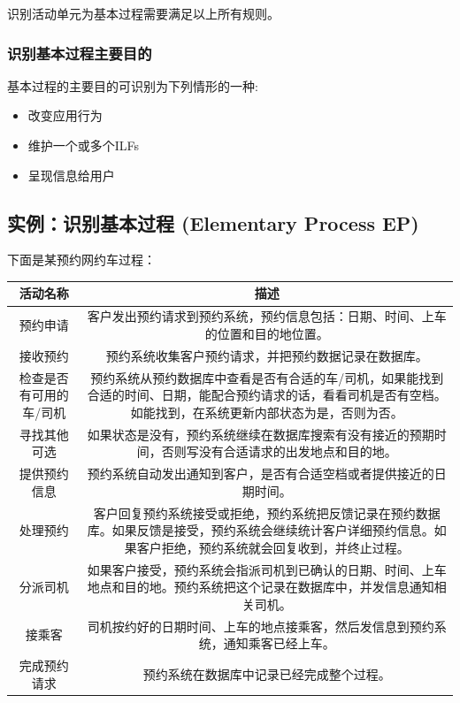 识别活动单元为基本过程需要满足以上所有规则。\\

\hypertarget{ux8bc6ux522bux57faux672cux8fc7ux7a0bux4e3bux8981ux76eeux7684}{%
\subsubsection{识别基本过程主要目的}\label{ux8bc6ux522bux57faux672cux8fc7ux7a0bux4e3bux8981ux76eeux7684}}

基本过程的主要目的可识别为下列情形的一种:

\begin{itemize}
\tightlist
\item
  改变应用行为
\item
  维护一个或多个ILFs
\item
  呈现信息给用户
\end{itemize}

\hypertarget{ux5b9eux4f8bux8bc6ux522bux57faux672cux8fc7ux7a0b-ep-elementary-process}{%
\subsection{实例：识别基本过程 (Elementary
Process EP)}\label{ux5b9eux4f8bux8bc6ux522bux57faux672cux8fc7ux7a0b-ep-elementary-process}}

下面是某预约网约车过程：


\begin{tabular}{|c|c|}
\hline
活动名称&描述\\
\hline
预约申请&客户发出预约请求到预约系统，预约信息包括：日期、时间、上车的位置和目的地位置。\\
\hline
接收预约&预约系统收集客户预约请求，并把预约数据记录在数据库。\\
\hline
检查是否有可用的车/司机&预约系统从预约数据库中查看是否有合适的车/司机，如果能找到合适的时间、日期，能配合预约请求的话，看看司机是否有空档。如能找到，在系统更新内部状态为是，否则为否。 \\
\hline
寻找其他可选&如果状态是没有，预约系统继续在数据库搜索有没有接近的预期时间，否则写没有合适请求的出发地点和目的地。 \\
\hline
提供预约信息&预约系统自动发出通知到客户，是否有合适空档或者提供接近的日期时间。 \\
\hline
处理预约&客户回复预约系统接受或拒绝，预约系统把反馈记录在预约数据库。如果反馈是接受，预约系统会继续统计客户详细预约信息。如果客户拒绝，预约系统就会回复收到，并终止过程。 \\
\hline
分派司机&如果客户接受，预约系统会指派司机到已确认的日期、时间、上车地点和目的地。预约系统把这个记录在数据库中，并发信息通知相关司机。 \\
\hline
接乘客&司机按约好的日期时间、上车的地点接乘客，然后发信息到预约系统，通知乘客已经上车。\\
\hline
完成预约请求&预约系统在数据库中记录已经完成整个过程。\\
\hline
\end{tabular}


